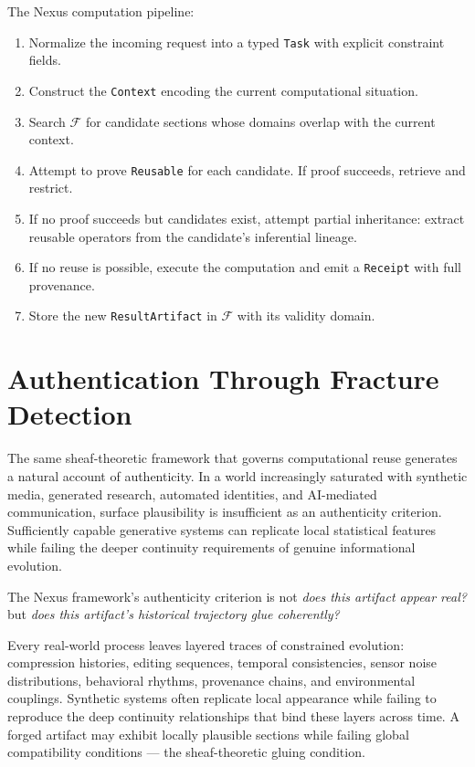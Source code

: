 \begin{technote}
The Nexus computation pipeline:
\begin{enumerate}
  \item Normalize the incoming request into a typed
  \texttt{Task} with explicit constraint fields.
  \item Construct the \texttt{Context} encoding the
  current computational situation.
  \item Search $\mathcal{F}$ for candidate sections
  whose domains overlap with the current context.
  \item Attempt to prove \texttt{Reusable} for each
  candidate. If proof succeeds, retrieve and restrict.
  \item If no proof succeeds but candidates exist,
  attempt partial inheritance: extract reusable
  operators from the candidate's inferential lineage.
  \item If no reuse is possible, execute the computation
  and emit a \texttt{Receipt} with full provenance.
  \item Store the new \texttt{ResultArtifact} in
  $\mathcal{F}$ with its validity domain.
\end{enumerate}
\end{technote}

\section{Authentication Through Fracture Detection}
\label{sec:fracture-detection}

The same sheaf-theoretic framework that governs
computational reuse generates a natural account of
authenticity. In a world increasingly saturated with
synthetic media, generated research, automated identities,
and AI-mediated communication, surface plausibility is
insufficient as an authenticity criterion. Sufficiently
capable generative systems can replicate local statistical
features while failing the deeper continuity requirements
of genuine informational evolution.

The Nexus framework's authenticity criterion is not
\emph{does this artifact appear real?} but \emph{does
this artifact's historical trajectory glue coherently?}

Every real-world process leaves layered traces of
constrained evolution: compression histories, editing
sequences, temporal consistencies, sensor noise
distributions, behavioral rhythms, provenance chains,
and environmental couplings. Synthetic systems often
replicate local appearance while failing to reproduce
the deep continuity relationships that bind these layers
across time. A forged artifact may exhibit locally
plausible sections while failing global compatibility
conditions --- the sheaf-theoretic gluing condition.

